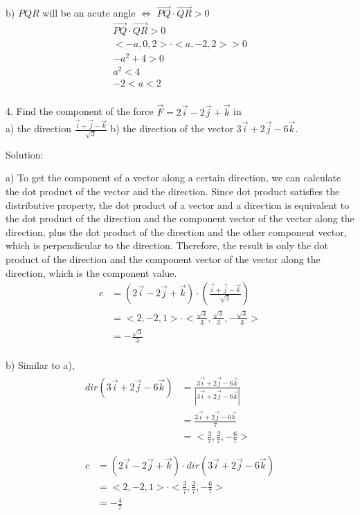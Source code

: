 \documentclass{article}
\begin{document}
b) $PQR$ will be an acute angle $\iff$ $\vec{PQ} \cdot \vec{QR} > 0$
\begin{gather*}
  \vec{PQ} \cdot \vec{QR} > 0 \\
  <-a, 0, 2> \cdot <a, -2, 2> > 0 \\
  -a^2 + 4 > 0 \\
  a^2 < 4 \\
  -2 < a < 2 \\
\end{gather*}

4. Find the component of the force $\vec{F} = 2 \vec{i} - 2 \vec{j} + \vec{k}$
in\\
a) the direction $\frac{\vec{i} + \vec{j} - \vec{k}}{\sqrt{3}}$ \hspace{10px}
b) the direction of the vector $3 \vec{i} + 2 \vec{j} - 6 \vec{k}$.

Solution:

a) To get the component of a vector along a certain direction, we can calculate 
the dot product of the vector and the direction. Since dot product satisfies the 
distributive property, the dot product of a vector and a direction is equivalent 
to the dot product of the direction and the component vector of the vector along 
the direction, plus the dot product of the direction and the other component 
vector, which is perpendicular to the direction. Therefore, the result is only 
the dot product of the direction and the component vector of the vector along 
the direction, which is the component value.
\begin{equation*}
\begin{split}
  c &= (2\vec{i} - 2\vec{j} + \vec{k}) \cdot (\frac{\vec{i} + \vec{j} - \vec{k}}{\sqrt{3}}) \\
    &= <2, -2, 1> \cdot <\frac{\sqrt{3}}{3}, \frac{\sqrt{3}}{3}, -\frac{\sqrt{3}}{3}> \\
    &= -\frac{\sqrt{3}}{3} \\
\end{split}
\end{equation*}

b) Similar to a),
\begin{gather*}
\begin{split}
  dir(3\vec{i} + 2\vec{j} - 6\vec{k}) &= \frac{3\vec{i} + 2\vec{j} - 6\vec{k}}{|3\vec{i} + 2\vec{j} - 6\vec{k}|} \\
                                      &= \frac{3\vec{i} + 2\vec{j} - 6\vec{k}}{7} \\
                                      &= <\frac{3}{7}, \frac{2}{7}, -\frac{6}{7}> \\
\end{split} \\
\begin{split}
  c &= (2\vec{i} - 2\vec{j} + \vec{k}) \cdot dir(3\vec{i} + 2\vec{j} - 6\vec{k}) \\
    &= <2, -2, 1> \cdot <\frac{3}{7}, \frac{2}{7}, -\frac{6}{7}> \\
    &= -\frac{4}{7} \\
\end{split} \\
\end{gather*}
\end{document}
